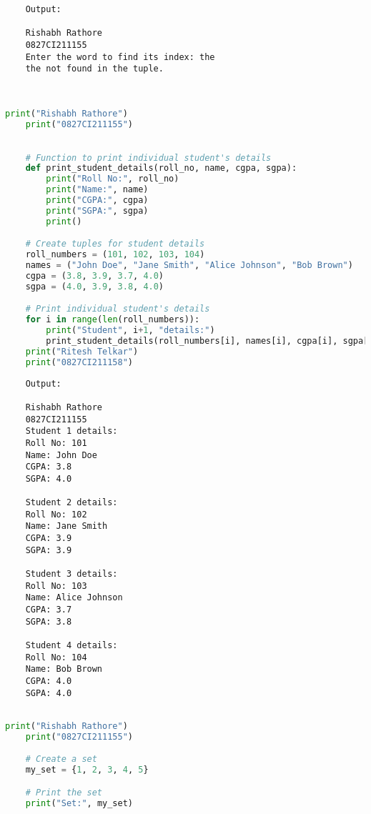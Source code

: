 \documentclass{report}
\begin{document}
\begin{verbatim}
	Output:

	Rishabh Rathore
	0827CI211155
	Enter the word to find its index: the
	the not found in the tuple.



\end{verbatim}


\newpage


\sol 
\begin{lstlisting}[language=Python]
	print("Rishabh Rathore")
	print("0827CI211155")

	
	# Function to print individual student's details
	def print_student_details(roll_no, name, cgpa, sgpa):
		print("Roll No:", roll_no)
		print("Name:", name)
		print("CGPA:", cgpa)
		print("SGPA:", sgpa)
		print()

	# Create tuples for student details
	roll_numbers = (101, 102, 103, 104)
	names = ("John Doe", "Jane Smith", "Alice Johnson", "Bob Brown")
	cgpa = (3.8, 3.9, 3.7, 4.0)
	sgpa = (4.0, 3.9, 3.8, 4.0)

	# Print individual student's details
	for i in range(len(roll_numbers)):
		print("Student", i+1, "details:")
		print_student_details(roll_numbers[i], names[i], cgpa[i], sgpa[i])
	print("Ritesh Telkar")
	print("0827CI211158")
\end{lstlisting}

\begin{verbatim}
	Output:

	Rishabh Rathore
	0827CI211155
	Student 1 details:
	Roll No: 101
	Name: John Doe
	CGPA: 3.8
	SGPA: 4.0

	Student 2 details:
	Roll No: 102
	Name: Jane Smith
	CGPA: 3.9
	SGPA: 3.9

	Student 3 details:
	Roll No: 103
	Name: Alice Johnson
	CGPA: 3.7
	SGPA: 3.8

	Student 4 details:
	Roll No: 104
	Name: Bob Brown
	CGPA: 4.0
	SGPA: 4.0


\end{verbatim}



\newpage


\sol 
\begin{lstlisting}[language=Python]
	print("Rishabh Rathore")
	print("0827CI211155")

	# Create a set
	my_set = {1, 2, 3, 4, 5}

	# Print the set
	print("Set:", my_set)
\end{lstlisting}
\end{document}
